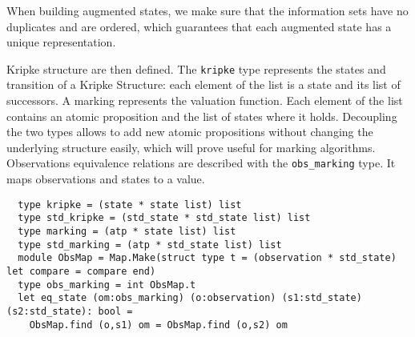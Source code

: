 \documentclass[dvipsnames]{acmart}
\begin{document}
When building augmented states, we make sure that the information sets have no duplicates and are ordered, which guarantees that each augmented state has a unique representation.

Kripke structure are then defined. The \lstinline{kripke} type represents the states and transition of a Kripke Structure: each element of the list is a state and its list of successors.
A marking represents the valuation function. Each element of the list contains an atomic proposition and the list of states where it holds.
Decoupling the two types allows to add new atomic propositions without changing the underlying structure easily, which will prove useful for marking algorithms.
Observations equivalence relations are described with the \lstinline{obs_marking} type. It maps observations and states to a value. 

\begin{lstlisting}
  type kripke = (state * state list) list
  type std_kripke = (std_state * std_state list) list
  type marking = (atp * state list) list
  type std_marking = (atp * std_state list) list
  module ObsMap = Map.Make(struct type t = (observation * std_state) let compare = compare end)
  type obs_marking = int ObsMap.t
  let eq_state (om:obs_marking) (o:observation) (s1:std_state) (s2:std_state): bool =
    ObsMap.find (o,s1) om = ObsMap.find (o,s2) om
\end{lstlisting}
\end{document}
